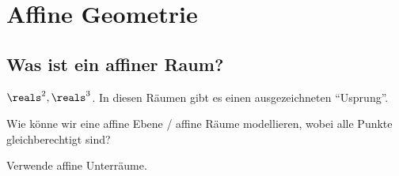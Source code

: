 \chapter{Affine Geometrie}
\section{Was ist ein affiner Raum?}
\begin{beispiel}
    \( \reals^2, \reals^3 \). 
    In diesen Räumen gibt es einen ausgezeichneten \enquote{Usprung}.
\end{beispiel}
\begin{frage*}
    Wie könne wir eine affine Ebene / affine Räume modellieren, wobei alle Punkte gleichberechtigt sind?
\end{frage*}
\begin{idee*}
    Verwende affine Unterräume.
\end{idee*}
